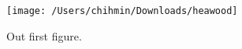 \documentclass{article}
\begin{document}
  \begin{figure}[thb]
    \centering\texttt{[image: /Users/chihmin/Downloads/heawood]}
    \caption{Out first figure.}\label{fig:test}
  \end{figure}
\end{document}
